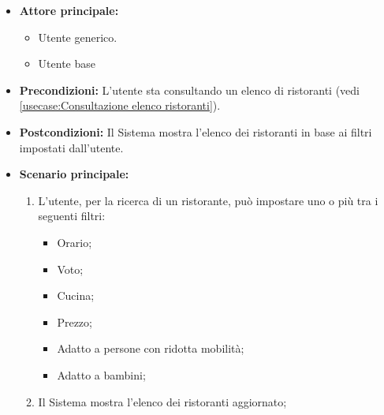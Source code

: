 \label{usecase:Filtra ristoranti}
\begin{itemize}
	\item \textbf{Attore principale:}
    \begin{itemize}
        \item Utente generico.
        \item Utente base
    \end{itemize}
	
	\item \textbf{Precondizioni:} L'utente sta consultando un elenco di ristoranti (vedi \autoref{usecase:Consultazione elenco ristoranti}).

	\item \textbf{Postcondizioni:} Il Sistema mostra l'elenco dei ristoranti in base ai filtri impostati dall'utente.
 
	      
	\item \textbf{Scenario principale:}
	      \begin{enumerate}
		      \item L'utente, per la ricerca di un ristorante, può impostare uno o più tra i seguenti filtri:
		      \begin{itemize}
                \item Orario;
                \item Voto;
                \item Cucina;
                \item Prezzo;
                \item Adatto a persone con ridotta mobilità;
                \item Adatto a bambini;
              \end{itemize}

		      \item Il Sistema mostra l'elenco dei ristoranti aggiornato;
	      \end{enumerate}

\end{itemize}
